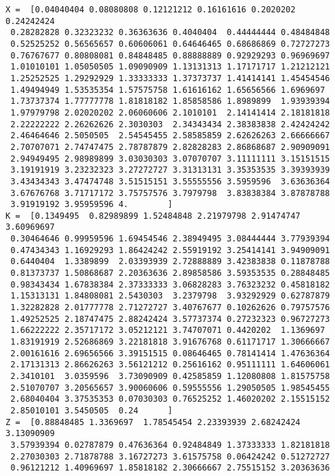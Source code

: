 \documentclass[11pt]{article}
\begin{document}
    \begin{Verbatim}[commandchars=\\\{\}]
X =  [0.04040404 0.08080808 0.12121212 0.16161616 0.2020202  0.24242424
 0.28282828 0.32323232 0.36363636 0.4040404  0.44444444 0.48484848
 0.52525252 0.56565657 0.60606061 0.64646465 0.68686869 0.72727273
 0.76767677 0.80808081 0.84848485 0.88888889 0.92929293 0.96969697
 1.01010101 1.05050505 1.09090909 1.13131313 1.17171717 1.21212121
 1.25252525 1.29292929 1.33333333 1.37373737 1.41414141 1.45454546
 1.49494949 1.53535354 1.57575758 1.61616162 1.65656566 1.6969697
 1.73737374 1.77777778 1.81818182 1.85858586 1.8989899  1.93939394
 1.97979798 2.02020202 2.06060606 2.1010101  2.14141414 2.18181818
 2.22222222 2.26262626 2.3030303  2.34343434 2.38383838 2.42424242
 2.46464646 2.5050505  2.54545455 2.58585859 2.62626263 2.66666667
 2.70707071 2.74747475 2.78787879 2.82828283 2.86868687 2.90909091
 2.94949495 2.98989899 3.03030303 3.07070707 3.11111111 3.15151515
 3.19191919 3.23232323 3.27272727 3.31313131 3.35353535 3.39393939
 3.43434343 3.47474748 3.51515151 3.55555556 3.5959596  3.63636364
 3.67676768 3.71717172 3.75757576 3.7979798  3.83838384 3.87878788
 3.91919192 3.95959596 4.        ]
K =  [0.1349495  0.82989899 1.52484848 2.21979798 2.91474747 3.60969697
 0.30464646 0.99959596 1.69454546 2.38949495 3.08444444 3.77939394
 0.47434343 1.16929293 1.86424242 2.55919192 3.25414141 3.94909091
 0.6440404  1.3389899  2.03393939 2.72888889 3.42383838 0.11878788
 0.81373737 1.50868687 2.20363636 2.89858586 3.59353535 0.28848485
 0.98343434 1.67838384 2.37333333 3.06828283 3.76323232 0.45818182
 1.15313131 1.84808081 2.5430303  3.2379798  3.93292929 0.62787879
 1.32282828 2.01777778 2.71272727 3.40767677 0.10262626 0.79757576
 1.49252525 2.18747475 2.88242424 3.57737374 0.27232323 0.96727273
 1.66222222 2.35717172 3.05212121 3.74707071 0.4420202  1.1369697
 1.83191919 2.52686869 3.22181818 3.91676768 0.61171717 1.30666667
 2.00161616 2.69656566 3.39151515 0.08646465 0.78141414 1.47636364
 2.17131313 2.86626263 3.56121212 0.25616162 0.95111111 1.64606061
 2.3410101  3.0359596  3.73090909 0.42585859 1.12080808 1.81575758
 2.51070707 3.20565657 3.90060606 0.59555556 1.29050505 1.98545455
 2.68040404 3.37535353 0.07030303 0.76525252 1.46020202 2.15515152
 2.85010101 3.5450505  0.24      ]
Z =  [0.88848485 1.3369697  1.78545454 2.23393939 2.68242424 3.13090909
 3.57939394 0.02787879 0.47636364 0.92484849 1.37333333 1.82181818
 2.27030303 2.71878788 3.16727273 3.61575758 0.06424242 0.51272727
 0.96121212 1.40969697 1.85818182 2.30666667 2.75515152 3.20363636

\end{Verbatim}
\end{document}
